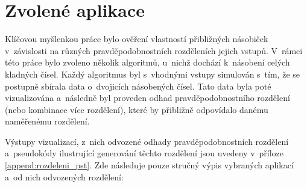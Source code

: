 \section{Zvolené aplikace} \label{zvolene_aplikace}
Klíčovou myšlenkou práce bylo ověření vlastností přibližných násobiček v~závislosti na různých pravděpodobnostních rozděleních jejich vstupů. V~rámci této práce bylo zvoleno několik algoritmů, u~nichž dochází k~násobení celých kladných čísel. Každý algoritmus byl s~vhodnými vstupy simulován s~tím, že se postupně sbírala data o~dvojicích násobených čísel. Tato data byla poté vizualizována a~následně byl proveden odhad pravděpodobnostního rozdělení (nebo kombinace více rozdělení), které by přibližně odpovídalo danému naměřenému rozdělení.

Výstupy vizualizací, z~nich odvozené odhady pravděpodobnostních rozdělení a~pseudokódy ilustrující generování těchto rozdělení jsou uvedeny v~příloze \ref{append:rozdeleni_pst}. Zde následuje pouze stručný výpis vybraných aplikací a~od nich odvozených rozdělení:

